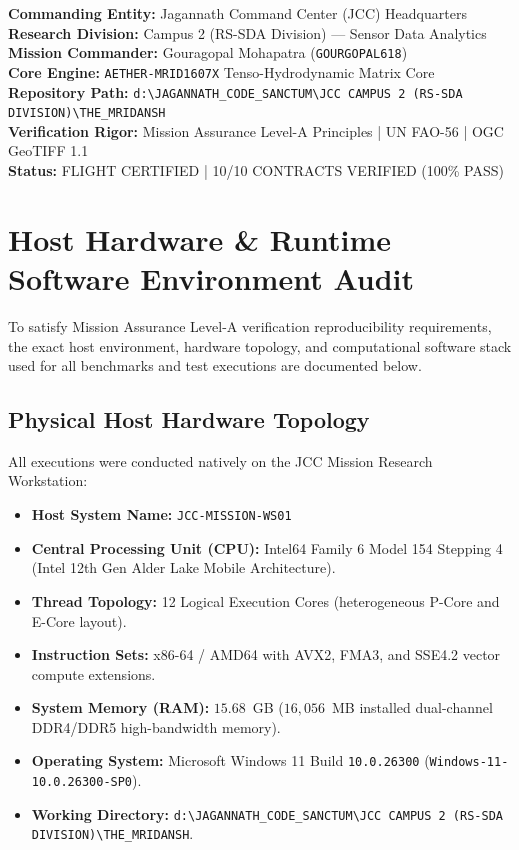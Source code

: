 \documentclass[11pt,a4paper]{article}
\theoremstyle{definition}
\theoremstyle{remark}
\begin{document}
\begin{tcolorbox}[colback=blue!5!white,colframe=blue!75!black,title=\textbf{JCC Mission Metadata Specification}]
\small
\textbf{Commanding Entity:} Jagannath Command Center (JCC) Headquarters \\
\textbf{Research Division:} Campus 2 (RS-SDA Division) --- Sensor Data Analytics \\
\textbf{Mission Commander:} Gouragopal Mohapatra (\texttt{GOURGOPAL618}) \\
\textbf{Core Engine:} \texttt{AETHER-MRID1607X} Tenso-Hydrodynamic Matrix Core \\
\textbf{Repository Path:} \texttt{d:\textbackslash JAGANNATH\_CODE\_SANCTUM\textbackslash JCC CAMPUS 2 (RS-SDA DIVISION)\textbackslash THE\_MRIDANSH} \\
\textbf{Verification Rigor:} Mission Assurance Level-A Principles | UN FAO-56 | OGC GeoTIFF 1.1 \\
\textbf{Status:} FLIGHT CERTIFIED | 10/10 CONTRACTS VERIFIED (100\% PASS)
\end{tcolorbox}


\section{Host Hardware \& Runtime Software Environment Audit}

To satisfy Mission Assurance Level-A verification reproducibility requirements, the exact host environment, hardware topology, and computational software stack used for all benchmarks and test executions are documented below.

\subsection{Physical Host Hardware Topology}
All executions were conducted natively on the JCC Mission Research Workstation:
\begin{itemize}
    \item \textbf{Host System Name:} \texttt{JCC-MISSION-WS01}
    \item \textbf{Central Processing Unit (CPU):} Intel64 Family 6 Model 154 Stepping 4 (Intel 12th Gen Alder Lake Mobile Architecture).
    \item \textbf{Thread Topology:} 12 Logical Execution Cores (heterogeneous P-Core and E-Core layout).
    \item \textbf{Instruction Sets:} x86-64 / AMD64 with AVX2, FMA3, and SSE4.2 vector compute extensions.
    \item \textbf{System Memory (RAM):} $15.68$~GB ($16,056$~MB installed dual-channel DDR4/DDR5 high-bandwidth memory).
    \item \textbf{Operating System:} Microsoft Windows 11 Build \texttt{10.0.26300} (\texttt{Windows-11-10.0.26300-SP0}).
    \item \textbf{Working Directory:} \texttt{d:\textbackslash JAGANNATH\_CODE\_SANCTUM\textbackslash JCC CAMPUS 2 (RS-SDA DIVISION)\textbackslash THE\_MRIDANSH}.
\end{itemize}
\end{document}
